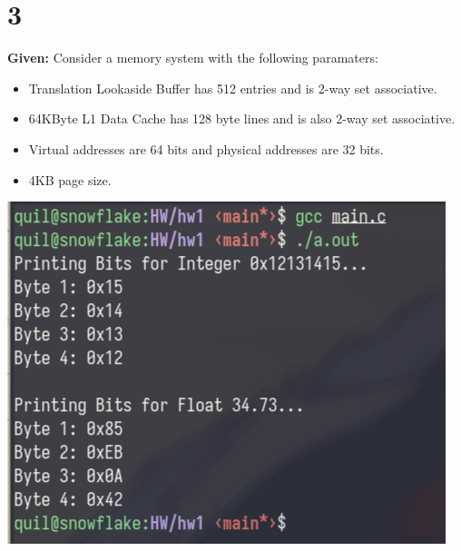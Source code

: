 \documentclass{article}
\begin{document}
\section{3}
\textbf{Given:} Consider a memory system with the following paramaters:
\begin{itemize}
	\item Translation Lookaside Buffer has 512 entries and is 2-way set associative.
	\item 64KByte L1 Data Cache has 128 byte lines and is also 2-way set associative.
	\item Virtual addresses are 64 bits and physical addresses are 32 bits.
	\item 4KB page size.
\end{itemize}


\includegraphics[width=\textwidth]{evidence.png}
\newpage

\newpage
\end{document}
